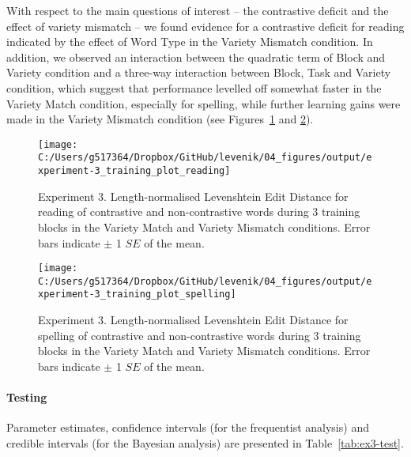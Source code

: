 \documentclass[doc,floatsintext]{apa6}
\let\oldparagraph\paragraph
\renewcommand{\paragraph}[1]{\oldparagraph{#1}\mbox{}}
\begin{document}
With respect to the main questions of interest -- the contrastive
deficit and the effect of variety mismatch -- we found evidence for a
contrastive deficit for reading indicated by the effect of Word Type in
the Variety Mismatch condition. In addition, we observed an interaction
between the quadratic term of Block and Variety condition and a
three-way interaction between Block, Task and Variety condition, which
suggest that performance levelled off somewhat faster in the Variety
Match condition, especially for spelling, while further learning gains
were made in the Variety Mismatch condition (see
Figures~\ref{fig:ex3-train-reading-plots} and
\ref{fig:ex3-train-spelling-plots}).

\newpage

\begin{figure}[H]

{\centering \texttt{[image: C:/Users/g517364/Dropbox/GitHub/levenik/04\_figures/output/experiment-3\_training\_plot\_reading]} 

}

\caption{Experiment 3. Length-normalised Levenshtein Edit Distance for reading of contrastive and non-contrastive words during 3 training blocks in the Variety Match and Variety Mismatch conditions. Error bars indicate $\pm$ 1 $SE$ of the mean.}\label{fig:ex3-train-reading-plots}
\end{figure}

\newpage

\begin{figure}[H]

{\centering \texttt{[image: C:/Users/g517364/Dropbox/GitHub/levenik/04\_figures/output/experiment-3\_training\_plot\_spelling]} 

}

\caption{Experiment 3. Length-normalised Levenshtein Edit Distance for spelling of contrastive and non-contrastive words during 3 training blocks in the Variety Match and Variety Mismatch conditions. Error bars indicate $\pm$ 1 $SE$ of the mean.}\label{fig:ex3-train-spelling-plots}
\end{figure}

\paragraph{Testing}\label{testing-3}

Parameter estimates, confidence intervals (for the frequentist analysis)
and credible intervals (for the Bayesian analysis) are presented in
Table~\ref{tab:ex3-test}.
\end{document}
